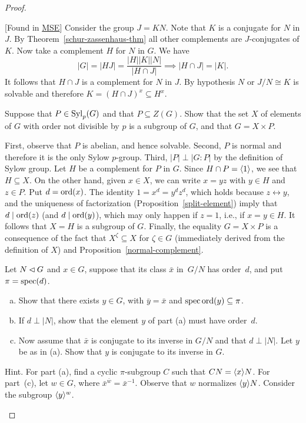 \begin{proof}
\begin{solution}
    {[Found in \href{https://math.stackexchange.com/a/3084/269050}{MSE}]} Consider the group $J=KN$. Note that $K$ is a conjugate for $N$ in $J$. By Theorem~\ref{schur-zassenhaus-thm} all other complements are $J$-conjugates of $K$. Now take a complement $H$ for $N$ in $G$. We have
    $$
        |G| = |HJ|=\frac{|H||K||N|}{|H\cap J|}\implies |H\cap J|=|K|.
    $$
    It follows that $H\cap J$ is a complement for $N$ in $J$. By hypothesis $N$ or $J/N\cong K$ is solvable and therefore $K=(H\cap J)^x\subseteq H^x$. 
\end{solution}

\begin{probl}
    Suppose that\/ $P \in {\rm Syl}_p(G)$ and that\/ $P \subseteq Z(G)$. Show that the set\/ $X$ of elements of\/ $G$ with order not divisible by\/ $p$ is a subgroup of\/ $G$, and that\/ $G = X \times P$.
\end{probl}

\begin{solution} First, observe that $P$ is abelian, and hence solvable. Second, $P$ is normal and therefore it is the only Sylow $p$-group. Third, $|P|\perp|G:P|$ by the definition of Sylow group. Let $H$ be a complement for $P$ in $G$. Since $H\cap P=\langle1\rangle$, we see that $H\subseteq X$. On the other hand, given $x\in X$, we can write $x=yz$ with $y\in H$ and $z\in P$. Put $d={\rm ord}(x)$. The identity $1=x^d=y^dz^d$, which holds because $z\leftrightarrow y$, and the uniqueness of factorization (Proposition~\ref{split-element}) imply that $d\mid{\rm ord}(z)$ (and $d\mid{\rm ord}(y)$), which may only happen if $z=1$, i.e., if $x=y\in H$. It follows that $X=H$ is a subgroup of $G$. Finally, the equality $G=X\times P$ is a consequence of the fact that $X^\zeta\subseteq X$ for $\zeta\in G$ (immediately derived from the definition of $X$) and Proposition~\ref{normal-complement}.  \end{solution}


\begin{probl}
    Let\/ $N\lhd G$ and\/ $x \in G$, suppose that its class\/ $\bar x$ in~$G/N$ has order\/~$d$, and put $\pi=\operatorname{spec}(d)$.
    \begin{enumerate}[a),font=\upshape]
        \item Show that there exists\/ $y \in G$, with $\bar y=\bar x$ and\/ $\operatorname{spec}{\rm ord}(y)\subseteq\pi$.
        \item If\/ $d\perp|N|$, show that the element\/ $y$ of part\/ {\upshape(a)} must have order\/~$d$.
        \item Now assume that\/ $\bar x$ is conjugate to its inverse in\/ $G/N$ and that\/ $d\perp|N|$. Let\/ $y$ be as in\/ {\upshape (a)}. Show that\/ $y$ is conjugate to its inverse in\/ $G$.
    \end{enumerate}
    {\upshape Hint. For part (a), find a cyclic\/ $\pi$-subgroup\/ $C$ such that\/ $CN = \langle x\rangle N$. For part~(c), let\/ $w \in G$, where\/ $\bar x^{\bar w} = \bar x^{-1}$. Observe that\/ $w$ normalizes $\langle y\rangle N$. Consider the subgroup $\langle y\rangle^w$.}
\end{probl}


\end{proof}

